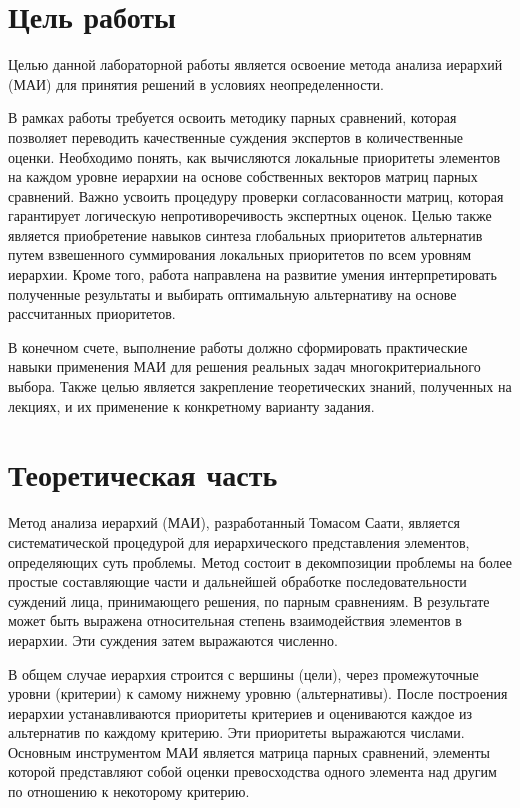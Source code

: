 

\section{Цель работы}

Целью данной лабораторной работы является освоение метода анализа иерархий (МАИ) для принятия решений в условиях неопределенности.

В рамках работы требуется освоить методику парных сравнений, которая позволяет переводить качественные суждения экспертов в количественные оценки. Необходимо понять, как вычисляются локальные приоритеты элементов на каждом уровне иерархии на основе собственных векторов матриц парных сравнений. Важно усвоить процедуру проверки согласованности матриц, которая гарантирует логическую непротиворечивость экспертных оценок. Целью также является приобретение навыков синтеза глобальных приоритетов альтернатив путем взвешенного суммирования локальных приоритетов по всем уровням иерархии. Кроме того, работа направлена на развитие умения интерпретировать полученные результаты и выбирать оптимальную альтернативу на основе рассчитанных приоритетов.

В конечном счете, выполнение работы должно сформировать практические навыки применения МАИ для решения реальных задач многокритериального выбора. Также целью является закрепление теоретических знаний, полученных на лекциях, и их применение к конкретному варианту задания.

\clearpage

\section{Теоретическая часть}

Метод анализа иерархий (МАИ), разработанный Томасом Саати, является систематической процедурой для иерархического представления элементов, определяющих суть проблемы. Метод состоит в декомпозиции проблемы на более простые составляющие части и дальнейшей обработке последовательности суждений лица, принимающего решения, по парным сравнениям. В результате может быть выражена относительная степень взаимодействия элементов в иерархии. Эти суждения затем выражаются численно.

В общем случае иерархия строится с вершины (цели), через промежуточные уровни (критерии) к самому нижнему уровню (альтернативы). После построения иерархии устанавливаются приоритеты критериев и оцениваются каждое из альтернатив по каждому критерию. Эти приоритеты выражаются числами. Основным инструментом МАИ является матрица парных сравнений, элементы которой представляют собой оценки превосходства одного элемента над другим по отношению к некоторому критерию.


